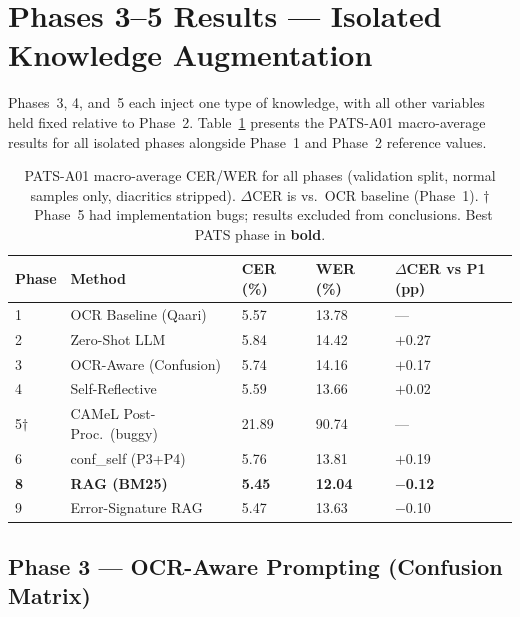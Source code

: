 \section{Phases 3--5 Results --- Isolated Knowledge Augmentation}
\label{sec:res_phases35}

Phases~3, 4, and~5 each inject one type of knowledge, with all other
variables held fixed relative to Phase~2. Table~\ref{tab:isolated_pats_macro}
presents the PATS-A01 macro-average results for all isolated phases alongside
Phase~1 and Phase~2 reference values.

\begin{table}[htbp]
  \centering
  \caption{PATS-A01 macro-average CER/WER for all phases (validation split,
           normal samples only, diacritics stripped). $\Delta$CER is vs.\ OCR
           baseline (Phase~1). $\dagger$~Phase~5 had implementation bugs;
           results excluded from conclusions. Best PATS phase in \textbf{bold}.}
  \label{tab:isolated_pats_macro}
  \begin{tabularx}{\textwidth}{llXXX}
    \toprule
    \textbf{Phase} & \textbf{Method} & \textbf{CER (\%)} & \textbf{WER (\%)}
      & \textbf{$\Delta$CER vs P1 (pp)} \\
    \midrule
    1  & OCR Baseline (Qaari)       &  5.57 & 13.78 & --- \\
    2  & Zero-Shot LLM              &  5.84 & 14.42 & $+$0.27 \\
    3  & OCR-Aware (Confusion)      &  5.74 & 14.16 & $+$0.17 \\
    4  & Self-Reflective            &  5.59 & 13.66 & $+$0.02 \\
    5$\dagger$ & CAMeL Post-Proc.\ (buggy) & 21.89 & 90.74 & --- \\
    6  & conf\_self (P3+P4)         &  5.76 & 13.81 & $+$0.19 \\
    \textbf{8}  & \textbf{RAG (BM25)}  & \textbf{5.45} & \textbf{12.04} & \textbf{$-$0.12} \\
    9  & Error-Signature RAG        &  5.47 & 13.63 & $-$0.10 \\
    \bottomrule
  \end{tabularx}
\end{table}

\subsection{Phase 3 --- OCR-Aware Prompting (Confusion Matrix)}
\label{subsec:res_p3}

